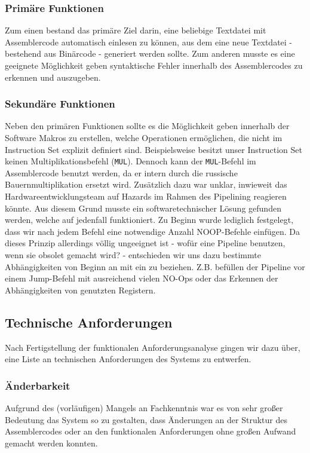 \documentclass[paper=a4,fontsize=12pt,twocolumn]{scrreprt}
\begin{document}
\subsubsection{Primäre Funktionen}
Zum einen bestand das primäre Ziel darin, eine beliebige Textdatei mit Assemblercode automatisch einlesen zu können, aus dem eine neue Textdatei - bestehend aus Binärcode - generiert werden sollte. Zum anderen musste es eine geeignete Möglichkeit geben syntaktische Fehler innerhalb des Assemblercodes zu erkennen und auszugeben.

\subsubsection{Sekundäre Funktionen}
Neben den primären Funktionen sollte es die Möglichkeit geben innerhalb der Software Makros zu erstellen, welche Operationen ermöglichen, die nicht im Instruction Set explizit definiert sind. Beispielsweise besitzt unser Instruction Set keinen Multiplikationsbefehl (\texttt{MUL}).
Dennoch kann der \texttt{MUL}-Befehl im Assemblercode benutzt werden, da er intern durch die russische Bauernmultiplikation ersetzt wird.
Zusätzlich dazu war unklar, inwieweit das Hardwareentwicklungsteam auf Hazards im Rahmen des Pipelining reagieren könnte. Aus diesem Grund musste ein softwaretechnischer Lösung  gefunden werden, welche auf jedenfall funktioniert.
Zu Beginn wurde lediglich festgelegt, dass wir nach jedem Befehl eine notwendige Anzahl NOOP-Befehle einfügen.
Da dieses Prinzip allerdings völlig ungeeignet ist - wofür eine Pipeline benutzen, wenn sie obsolet gemacht wird? - entschieden wir uns dazu bestimmte Abhängigkeiten von Beginn an mit ein zu beziehen.
Z.B. befüllen der Pipeline vor einem Jump-Befehl mit ausreichend vielen NO-Ops oder das Erkennen der Abhängigkeiten von genutzten Registern.

\subsection{Technische Anforderungen}
Nach Fertigstellung der funktionalen Anforderungsanalyse gingen wir dazu über, eine Liste an technischen Anforderungen des Systems zu entwerfen.

\subsubsection{Änderbarkeit}
Aufgrund des (vorläufigen) Mangels an Fachkenntnis war es von sehr großer Bedeutung das System so zu gestalten, dass Änderungen an der Struktur des Assemblercodes oder an den funktionalen Anforderungen ohne großen Aufwand gemacht werden konnten.
\end{document}
